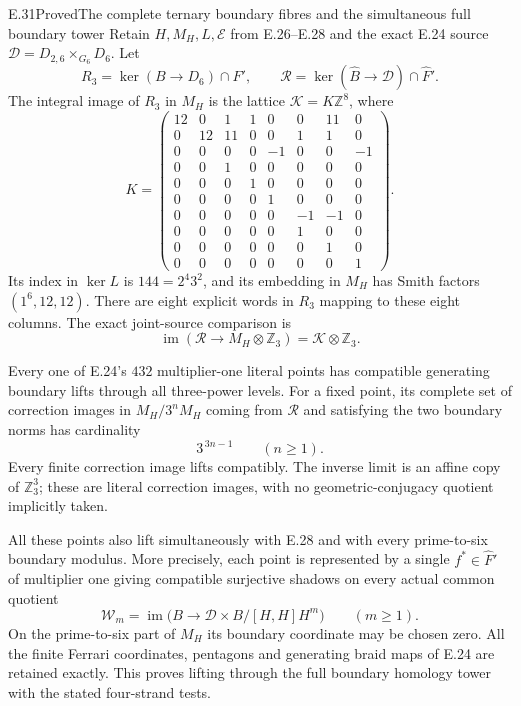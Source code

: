 \begin{statement}{E.31}{Proved}{The complete ternary boundary fibres and the simultaneous full boundary tower}
Retain $H,M_H,L,\mathcal E$ from E.26--E.28 and the exact
E.24 source $\mathscr D=D_{2,6}\times_{G_6}D_6$.
Let
\[
 R_3=\ker(B\to D_6)\cap F',\qquad
 \mathscr R=\ker(\widehat B\to\mathscr D)\cap\widehat F'.
 \tag{E.31.1}
\]
The integral image of $R_3$ in $M_H$ is the lattice
$\mathcal K=K\mathbb Z^8$, where
\[
 K=\begin{pmatrix}
 12&0&1&1&0&0&11&0\\
 0&12&11&0&0&1&1&0\\
 0&0&0&0&-1&0&0&-1\\
 0&0&1&0&0&0&0&0\\
 0&0&0&1&0&0&0&0\\
 0&0&0&0&1&0&0&0\\
 0&0&0&0&0&-1&-1&0\\
 0&0&0&0&0&1&0&0\\
 0&0&0&0&0&0&1&0\\
 0&0&0&0&0&0&0&1
 \end{pmatrix}.
 \tag{E.31.2}
\]
Its index in $\ker L$ is $144=2^4 3^2$, and its
embedding in $M_H$ has Smith factors $(1^6,12,12)$.
There are eight explicit words in $R_3$ mapping to
these eight columns.  The exact joint-source comparison is
\[
 \operatorname{im}(\mathscr R\to M_H\otimes\mathbb Z_3)
                   =\mathcal K\otimes\mathbb Z_3.
 \tag{E.31.3}
\]

Every one of E.24's $432$ multiplier-one literal points
has compatible generating boundary lifts through all
three-power levels.  For a fixed point, its complete
set of correction images in $M_H/3^nM_H$ coming from
$\mathscr R$ and satisfying the two boundary norms has
cardinality
\[
                         3^{\,3n-1}\qquad(n\ge1).
 \tag{E.31.4}
\]
Every finite correction image lifts compatibly.  The inverse
limit is an affine copy of $\mathbb Z_3^3$; these are literal
correction images, with no geometric-conjugacy quotient
implicitly taken.

All these points also lift simultaneously with E.28 and
with every prime-to-six boundary modulus.  More precisely,
each point is represented by a single
$f^\ast\in\widehat F'$ of multiplier one giving compatible
surjective shadows on every actual common quotient
\[
 \mathscr W_m=\operatorname{im}
 \bigl(B\longrightarrow
        \mathscr D\times B/[H,H]H^m\bigr)
                    \qquad(m\ge1).
 \tag{E.31.5}
\]
On the prime-to-six part of $M_H$ its boundary coordinate
may be chosen zero.  All the finite Ferrari coordinates,
pentagons and generating braid maps of E.24 are retained
exactly.  This proves lifting through the full boundary
homology tower with the stated four-strand tests.
\end{statement}
